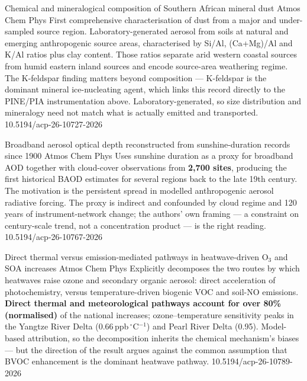 \documentclass[10pt]{article}
\begin{document}
{Chemical and mineralogical composition of Southern African mineral dust}
{Atmos Chem Phys}
{First comprehensive characterisation of dust from a major and under-sampled source
region. Laboratory-generated aerosol from soils at natural and emerging anthropogenic
source areas, characterised by Si/Al, (Ca+Mg)/Al and K/Al ratios plus clay content. Those
ratios separate arid western coastal sources from humid eastern inland sources and encode
source-area weathering regime. The K-feldspar finding matters beyond composition ---
K-feldspar is the dominant mineral ice-nucleating agent, which links this record directly
to the PINE/PIA instrumentation above. Laboratory-generated, so size distribution and
mineralogy need not match what is actually emitted and transported.}
{10.5194/acp-26-10727-2026}

{Broadband aerosol optical depth reconstructed from sunshine-duration records since 1900}
{Atmos Chem Phys}
{Uses sunshine duration as a proxy for broadband AOD together with cloud-cover
observations from \textbf{2{,}700 sites}, producing the first historical BAOD estimates for
several regions back to the late 19th century. The motivation is the persistent spread in
modelled anthropogenic aerosol radiative forcing. The proxy is indirect and confounded by
cloud regime and 120 years of instrument-network change; the authors' own framing --- a
constraint on century-scale trend, not a concentration product --- is the right reading.}
{10.5194/acp-26-10767-2026}

{Direct thermal versus emission-mediated pathways in heatwave-driven O$_3$ and SOA increases}
{Atmos Chem Phys}
{Explicitly decomposes the two routes by which heatwaves raise ozone and secondary organic
aerosol: direct acceleration of photochemistry, versus temperature-driven biogenic VOC and
soil-NO emissions. \textbf{Direct thermal and meteorological pathways account for over
80\% (normalised)} of the national increases; ozone--temperature sensitivity peaks in the
Yangtze River Delta (0.66\,ppb\,$^{\circ}$C$^{-1}$) and Pearl River Delta (0.95). Model-based
attribution, so the decomposition inherits the chemical mechanism's biases --- but the
direction of the result argues against the common assumption that BVOC enhancement is the
dominant heatwave pathway.}
{10.5194/acp-26-10789-2026}
\end{document}
